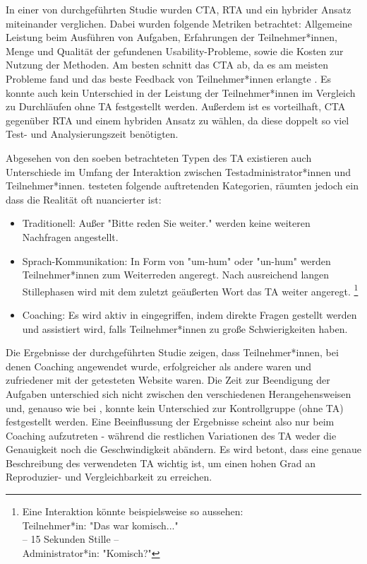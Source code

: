 In einer \citeyear{alhadretiRethinkingThinking2018} von \citeauthor{alhadretiRethinkingThinking2018} \cite{alhadretiRethinkingThinking2018} durchgeführten Studie wurden \ac{CTA}, \ac{RTA} und ein hybrider Ansatz miteinander verglichen. Dabei wurden folgende Metriken betrachtet: Allgemeine Leistung beim Ausführen von Aufgaben, Erfahrungen der Teilnehmer*innen, Menge und Qualität der gefundenen Usability-Probleme, sowie die Kosten zur Nutzung der Methoden. Am besten schnitt das \acl{CTA} ab, da es am meisten Probleme fand und das beste Feedback von Teilnehmer*innen erlangte . Es konnte auch kein Unterschied in der Leistung der Teilnehmer*innen im Vergleich zu Durchläufen ohne \ac{TA} festgestellt werden. Außerdem ist es vorteilhaft, \ac{CTA} gegenüber \ac{RTA} und einem hybriden Ansatz zu wählen, da diese doppelt so viel Test- und Analysierungszeit benötigten. \cite{alhadretiRethinkingThinking2018} 

Abgesehen von den soeben betrachteten Typen des \acl{TA} existieren auch Unterschiede im Umfang der Interaktion zwischen Testadministrator*innen und Teilnehmer*innen. \citeauthor{olmsted-hawalaThinkaloudProtocols2010} \cite{olmsted-hawalaThinkaloudProtocols2010} testeten folgende auftretenden Kategorien, räumten jedoch ein dass die Realität oft nuancierter ist:
\begin{itemize}
  \item Traditionell: Außer "Bitte reden Sie weiter." werden keine weiteren Nachfragen angestellt.
  \item Sprach-Kommunikation: In Form von "um-hum" oder "un-hum" werden Teilnehmer*innen zum Weiterreden angeregt. Nach ausreichend langen Stillephasen wird mit dem zuletzt geäußerten Wort das \acl{TA} weiter angeregt. \footnote{Eine Interaktion könnte beispielsweise so aussehen:\\ Teilnehmer*in: "Das war komisch..." \\ -- 15 Sekunden Stille -- \\ Administrator*in: "Komisch?"} 
  \item Coaching: Es wird aktiv in eingegriffen, indem direkte Fragen gestellt werden und assistiert wird, falls Teilnehmer*innen zu große Schwierigkeiten haben.
\end{itemize}
Die Ergebnisse der \citeyear{olmsted-hawalaThinkaloudProtocols2010} durchgeführten Studie zeigen, dass Teilnehmer*innen, bei denen Coaching angewendet wurde, erfolgreicher als andere waren und zufriedener mit der getesteten Website waren. Die Zeit zur Beendigung der Aufgaben unterschied sich nicht zwischen den verschiedenen Herangehensweisen und, genauso wie bei \citeauthor{alhadretiRethinkingThinking2018}, konnte kein Unterschied zur Kontrollgruppe (ohne \ac{TA}) festgestellt werden. Eine Beeinflussung der Ergebnisse scheint also nur beim Coaching aufzutreten - während die restlichen Variationen des \ac{TA} weder die Genauigkeit noch die Geschwindigkeit abändern. Es wird betont, dass eine genaue Beschreibung des verwendeten \acl{TA} wichtig ist, um einen hohen Grad an Reproduzier- und Vergleichbarkeit zu erreichen.

